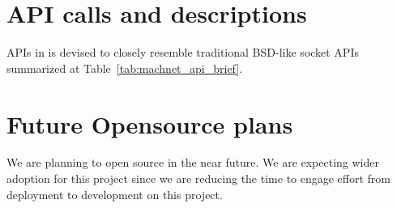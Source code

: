 \label{appendix}

\section{API calls and descriptions} APIs in \mt{} is devised to closely resemble traditional BSD-like socket APIs summarized at Table~\ref{tab:machnet_api_brief}.




\begin{table}[t!]
\centering
\caption{Summary of Machnet API Functions}
\label{tab:machnet_api_brief}
\end{table}

\section{Future Opensource plans} We are planning to open source \mt{} in the near future. We are expecting wider adoption for this project since we are reducing the time to engage effort from deployment to development on this project.

